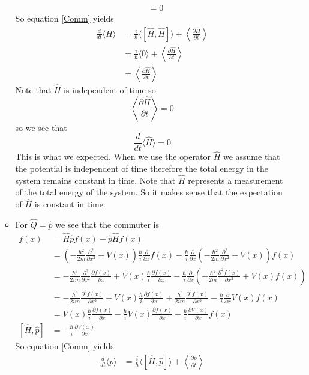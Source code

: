 \documentclass[11pt]{article}
\numberwithin{equation}{section}
\newcommand{\expt}[1]{\langle{#1}\rangle}
\begin{document}
\begin{enumerate}[(a)]
\begin{itemize}
\begin{align*}
&= 0
\end{align*}
So equation \ref{Comm} yields
\begin{align*}
\frac{d}{dt}\expt{H} &= \frac{i}{\hbar}\expt{[\hat{H},\hat{H}]}+\left\langle\frac{\partial\hat{H}}{\partial t}\right\rangle\\
&= \frac{i}{\hbar}\expt{0}+\left\langle\frac{\partial\hat{H}}{\partial t}\right\rangle\\
&= \left\langle\frac{\partial\hat{H}}{\partial t}\right\rangle
\end{align*}
Note that $\hat{H}$ is independent of time so 
$$\left\langle\frac{\partial\hat{H}}{\partial t}\right\rangle = 0$$
so we see that
$$\frac{d}{dt}\expt{\hat{H}} = 0$$
This is what we expected. When we use the operator $\hat{H}$ we assume that the potential is independent of time therefore the total energy in the system remains constant in time. Note that $\hat{H}$ represents a measurement of the total energy of the system. So it makes sense that the expectation of $\hat{H}$ is constant in time. 
\item For $\hat{Q}=\hat{p}$ we see that the commuter is
\begin{align*}
[\hat{H},\hat{p}]f(x) &= \hat{H}\hat{p}f(x) - \hat{p}\hat{H}f(x)\\
&= \left(-\frac{\hbar^2}{2m}\frac{\partial^2}{\partial x^2}+V(x)\right)\frac{\hbar}{i}\frac{\partial}{\partial x}f(x) - \frac{\hbar}{i}\frac{\partial}{\partial x}\left(-\frac{\hbar^2}{2m}\frac{\partial^2}{\partial x^2}+V(x)\right)f(x)\\
&= -\frac{\hbar^3}{2im}\frac{\partial^2}{\partial x^2}\frac{\partial f(x)}{\partial x}+V(x)\frac{\hbar}{i}\frac{\partial f(x)}{\partial x} - \frac{\hbar}{i}\frac{\partial}{\partial x}\left(-\frac{\hbar^2}{2m}\frac{\partial^2f(x)}{\partial x^2}+V(x)f(x)\right)\\
&= -\frac{\hbar^3}{2im}\frac{\partial^3 f(x)}{\partial x^3}+V(x)\frac{\hbar}{i}\frac{\partial f(x)}{\partial x} + \frac{\hbar^3}{2im}\frac{\partial^3f(x)}{\partial x^3}- \frac{\hbar}{i}\frac{\partial}{\partial x}V(x)f(x)\\
&= V(x)\frac{\hbar}{i}\frac{\partial f(x)}{\partial x} - \frac{\hbar}{i}V(x)\frac{\partial f(x)}{\partial x} - \frac{\hbar}{i}\frac{\partial V(x)}{\partial x}f(x)\\
[\hat{H},\hat{p}] &=  -\frac{\hbar}{i}\frac{\partial V(x)}{\partial x}
\end{align*}
So equation \ref{Comm} yields
\begin{align*}
\frac{d}{dt}\expt{p} &= \frac{i}{\hbar}\expt{[\hat{H},\hat{p}]}+\left\langle\frac{\partial\hat{p}}{\partial t}\right\rangle\\

\end{align*}
\end{itemize}
\end{enumerate}
\end{document}
